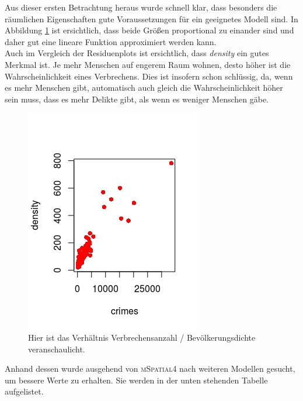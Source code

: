 \par\smallskip
Aus dieser ersten Betrachtung heraus wurde schnell klar, dass besonders die r\"aumlichen Eigenschaften gute Voraussetzungen f\"ur ein geeignetes Modell sind.
In Abbildung \ref{fig:dcc} ist ersichtlich, dass beide Gr\"o\ss{}en proportional zu einander sind und daher gut eine lineare Funktion approximiert werden kann. \\
Auch im Vergleich der Residuenplots ist ersichtlich, dass \textit{density} ein gutes Merkmal ist.
Je mehr Menschen auf engerem Raum wohnen, desto h\"oher ist die Wahrscheinlichkeit eines Verbrechens.
Dies ist insofern schon schl\"ussig, da, wenn es mehr Menschen gibt, automatisch auch gleich die Wahrscheinlichkeit h\"oher sein muss, dass es mehr Delikte gibt, als wenn es weniger Menschen g\"abe.

\begin{figure}
\centering
\includegraphics[scale=0.7]{./jpgs/dcc.jpeg}
\caption{Hier ist das Verh\"altnis Verbrechensanzahl / Bev\"olkerungsdichte veranschaulicht.}
\label{fig:dcc}
\end{figure}

Anhand dessen wurde ausgehend von \textsc{mSpatial4} nach weiteren Modellen gesucht, um bessere Werte zu erhalten.
Sie werden in der unten stehenden Tabelle aufgelistet.

